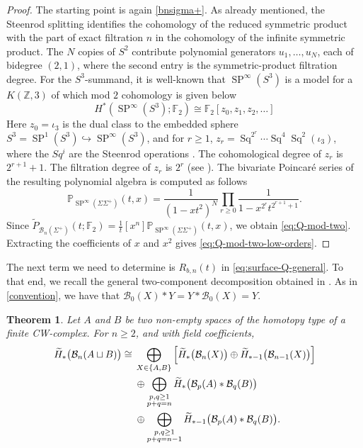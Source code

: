\documentclass[11pt,a4paper]{article}
\numberwithin{equation}{section}
\newtheorem{thm}{Theorem}[section]
\theoremstyle{definition}
\theoremstyle{remark}
\newcommand{\Si}{\Sigma}
\newcommand{\wt}{\widetilde}
\newcommand{\BB}{\mathcal B}
\newcommand{\SP}{\operatorname{SP}}
\begin{document}
\begin{proof}
The starting point is again \eqref{bnsigma+}.
As already mentioned, the Steenrod splitting identifies the cohomology of the reduced symmetric
product with the part of exact filtration \(n\) in the cohomology of the
infinite symmetric product.  The \(N\) copies of \(S^2\) contribute
polynomial generators \(u_1,\ldots,u_N\), each of bidegree
\((2,1)\), where the second entry is the symmetric-product filtration degree.
For the \(S^3\)-summand, it is well-known that
$\SP^\infty (S^3)$ is a model for a $K(\mathbb Z,3)$ of which mod $2$ cohomology is given below
\[
H^*(\SP^\infty(S^3);\mathbb F_2)
\cong
\mathbb F_2[z_0,z_1,z_2,\ldots]
\]
Here \(z_0=\iota_3\) is the dual class to the embedded sphere $S^3=\SP^1(S^3)\hookrightarrow \SP^\infty(S^3)$, and for \(r\ge1\),
\(z_r=\operatorname{Sq}^{2^r}\cdots
\operatorname{Sq}^{4}\operatorname{Sq}^{2}(\iota_3)\), where the $Sq^i$ are the Steenrod operations \cite{serre}.
The cohomological degree of $z_r$ is $2^{r+1}+1$. The filtration degree of $z_r$ is $2^r$ 
(see \cite[Theorem~11.2 and Example~11.3]{KallelKaroui2011}).
The bivariate Poincar\'e series of the resulting
polynomial algebra is computed as follows
\[
{\mathbb P}_{\SP^\infty (\Sigma\Sigma^+)}(t,x) = 
\frac{1}{(1-xt^2)^N}
\prod_{r\ge0}\frac{1}{1-x^{2^r}t^{2^{r+1}+1}}.
\]
Since $\wt P_{\BB_n(\Si^+)}(t;\mathbb F_2) = \frac{1}{t}[x^n]\mathbb P_{\SP^\infty (\Sigma\Sigma^+)}(t,x)$, we obtain
\eqref{eq:Q-mod-two}.  Extracting the coefficients of \(x\) and \(x^2\)
gives \eqref{eq:Q-mod-two-low-orders}.
\end{proof}

 The next term we need to determine is $R_{b,n}(t)$ in \eqref{eq:surface-Q-general}.  To that end, we recall the general two-component decomposition obtained in \cite{AKN2016}. As in \eqref{convention}, we have that $\BB_0(X)*Y=Y*\BB_0(X) = Y$.

\begin{thm}\label{thm:disjoint-two-components}
Let \(A\) and \(B\) be two non-empty spaces of the homotopy type of a finite CW-complex. For \(n\ge2\), and with field coefficients,
\begin{align*}
\wt H_*\bigl(\BB_n(A\sqcup B)\bigr)
\cong {}&
\bigoplus_{X\in\{A,B\}}
\left[
\wt H_*\bigl(\BB_n(X)\bigr)
\oplus
\wt H_{*-1}\bigl(\BB_{n-1}(X)\bigr)
\right]
\notag\\
&\oplus
\bigoplus_{\substack{p,q\ge1\\ p+q=n}}
\wt H_*\bigl(\BB_p(A)*\BB_q(B)\bigr)
\notag\\
&\oplus
\bigoplus_{\substack{p,q\ge1\\ p+q=n-1}}
\wt H_{*-1}\bigl(\BB_p(A)*\BB_q(B)\bigr).
\end{align*}
\end{thm}
\end{document}
